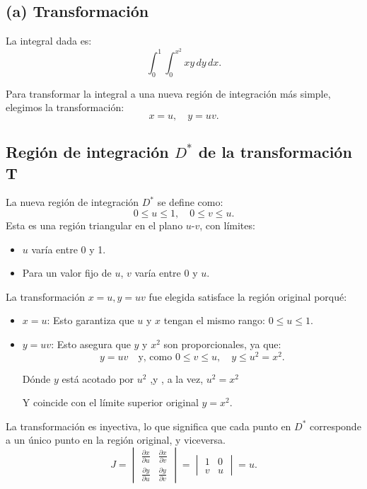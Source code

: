 
\subsection*{(a) Transformación}
La integral dada es:
\[
\int_0^1 \int_0^{x^2} xy \, dy \, dx.
\]

Para transformar la integral a una nueva región de integración más simple, elegimos la transformación:
\[
x = u, \quad y = uv.
\]

\subsection*{Región de integración \(D^*\) de la transformación T}

La nueva región de integración \(D^*\) se define como:
\[
0 \leq u \leq 1, \quad 0 \leq v \leq u.
\]
Esta es una región triangular en el plano \(u\)-\(v\), con límites:
\begin{itemize}
    \item \(u\) varía entre 0 y 1.
    \item Para un valor fijo de \(u\), \(v\) varía entre 0 y \(u\).
\end{itemize}


La transformación \(x = u, y = uv\) fue elegida satisface la región original porqué:
\begin{itemize}
    \item \(x = u\): Esto garantiza que \(u\) y \(x\) tengan el mismo rango: \(0 \leq u \leq 1\).
    \item \(y = uv\): Esto asegura que \(y\) y \(x^2\) son proporcionales, ya que:
    \[
    y = uv \quad \text{y, como } 0 \leq v \leq u, \quad y \leq u^2 = x^2.
    \]

    Dónde \( y \) está acotado por \(u^2\) ,y , a la vez, \( u^2 = x^2\)
    
    Y coincide con el límite superior original \(y = x^2\).
\end{itemize}

La transformación es inyectiva, lo que significa que cada punto en \(D^*\) corresponde a un único punto en la región original, y viceversa.
\[
J = \begin{vmatrix}
\frac{\partial x}{\partial u} & \frac{\partial x}{\partial v} \\
\frac{\partial y}{\partial u} & \frac{\partial y}{\partial v}
\end{vmatrix}
= \begin{vmatrix}
1 & 0 \\
v & u
\end{vmatrix} = u.
\]

